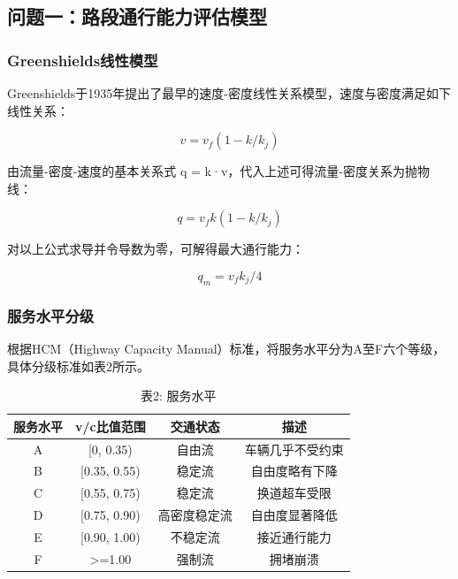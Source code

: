 \subsection{问题一：路段通行能力评估模型}

\subsubsection{Greenshields线性模型}

Greenshields于1935年提出了最早的速度-密度线性关系模型，速度与密度满足如下线性关系：

\begin{equation}
  v = v_{f} (1 - k/k_{j})
  \label{eq:1}
\end{equation}

由流量-密度-速度的基本关系式 q = k·v，代入上述可得流量-密度关系为抛物线：

\begin{equation}
  q = v_{f} k (1 - k/k_{j})
  \label{eq:2}
\end{equation}

对以上公式求导并令导数为零，可解得最大通行能力：

\begin{equation}
  q_{m} = v_{f} k_{j} / 4
  \label{eq:3}
\end{equation}

\subsubsection{服务水平分级}

根据HCM（Highway Capacity Manual）标准，将服务水平分为A至F六个等级，具体分级标准如表2所示。

\begin{table}[H]
  \centering
  \caption{表2: 服务水平}
  \label{tab:2}
  \begin{tabular}{cccc}
    \toprule
    服务水平 & v/c比值范围 & 交通状态 & 描述 \\
    \midrule
    A & [0, 0.35) & 自由流 & 车辆几乎不受约束 \\
    B & [0.35, 0.55) & 稳定流 & 自由度略有下降 \\
    C & [0.55, 0.75) & 稳定流 & 换道超车受限 \\
    D & [0.75, 0.90) & 高密度稳定流 & 自由度显著降低 \\
    E & [0.90, 1.00) & 不稳定流 & 接近通行能力 \\
    F & >=1.00 & 强制流 & 拥堵崩溃 \\
    \bottomrule
  \end{tabular}
\end{table}

